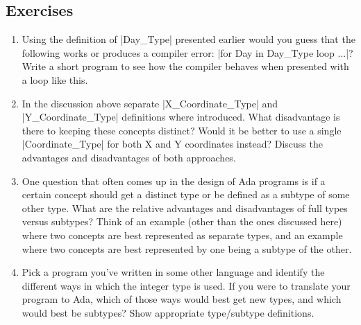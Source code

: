 \subsection*{Exercises}

\begin{enumerate}
\item Using the definition of |Day_Type| presented earlier would you guess that the following
  works or produces a compiler error: |for Day in Day_Type loop ...|? Write a short program to
  see how the compiler behaves when presented with a loop like this.

\item In the discussion above separate |X_Coordinate_Type| and |Y_Coordinate_Type| definitions
  where introduced. What disadvantage is there to keeping these concepts distinct? Would it be
  better to use a single |Coordinate_Type| for both X and Y coordinates instead? Discuss the
  advantages and disadvantages of both approaches.

\item One question that often comes up in the design of Ada programs is if a certain concept
  should get a distinct type or be defined as a subtype of some other type. What are the
  relative advantages and disadvantages of full types versus subtypes? Think of an example
  (other than the ones discussed here) where two concepts are best represented as separate
  types, and an example where two concepts are best represented by one being a subtype of the
  other.

\item Pick a program you've written in some other language and identify the different ways in
  which the integer type is used. If you were to translate your program to Ada, which of those
  ways would best get new types, and which would best be subtypes? Show appropriate type/subtype
  definitions.
\end{enumerate}

